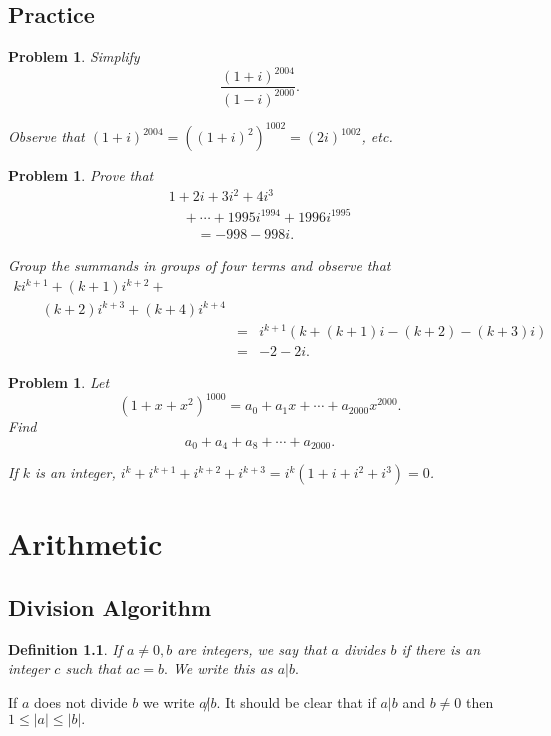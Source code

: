 \documentclass[11pt, openany]{book}
\theoremstyle{change} \theoremheaderfont{\blue\sffamily\bfseries}
\newtheorem{df}[thm]{Definition}
\newtheorem{pro}[thm]{Problem}
\theoremstyle{nonumberplain} \theoremheaderfont{\sffamily\bfseries}
\newcommand{\í}{\'{\i}}
\begin{document}
\section*{Practice}\begin{multicols}{2}\columnseprule 1pt \columnsep 25pt

\begin{pro} Simplify
$$\frac{(1 + i)^{2004}}{(1 - i)^{2000}}.$$
\begin{answer}
Observe that $(1+i)^{2004} = ((1+i)^2)^{1002} = (2i)^{1002}$, etc.
\end{answer}

\end{pro}
\begin{pro} Prove that
$$\begin{array}{l}1 + 2i + 3i^2 + 4i^{3} \\
\quad + \cdots + 1995i^{1994} + 1996i^{1995}  \\  \qquad  =  -998 -
998i.\end{array}$$
\begin{answer}
Group the summands in groups of four terms and observe that
$$
\begin{array}{lll}ki^{k+1} + (k+1)i^{k+2}+ & & \\ \qquad (k+2)i^{k+3}+ (k+4)i^{k+4} & &  \\  &  =  & i^{k+1}(k
+(k+1)i -(k+2)-(k+3)i) \\  & =  & -2-2i. \end{array}$$
\end{answer}

\end{pro}
\begin{pro} Let
$$(1 + x + x^2)^{1000} = a_0 + a_1x + \cdots + a_{2000}x^{2000}.$$Find
$$a_0 + a_4 + a_8 + \cdots + a_{2000}.$$
\begin{answer}
If $k$ is an integer, $i^k + i^{k + 1} + i^{k + 2} + i^{k + 3} =
i^{k}(1 + i + i^2 + i^3) = 0$.
\end{answer}
\end{pro}

\end{multicols}
\chapter{Arithmetic}
\section{Division Algorithm}
\begin{df}
If $a \neq 0, b$ are integers, we say that $a$ {\em divides} $b$
if there is an integer $c$ such that $ac = b.$ We write this as
$a|b.$ \end{df} If $a$ does not divide $b$ we write $a\not |b.$ It
should be clear that if $a|b$ and $b \neq 0$ then $1 \leq |a| \leq
|b|.$
\end{document}
